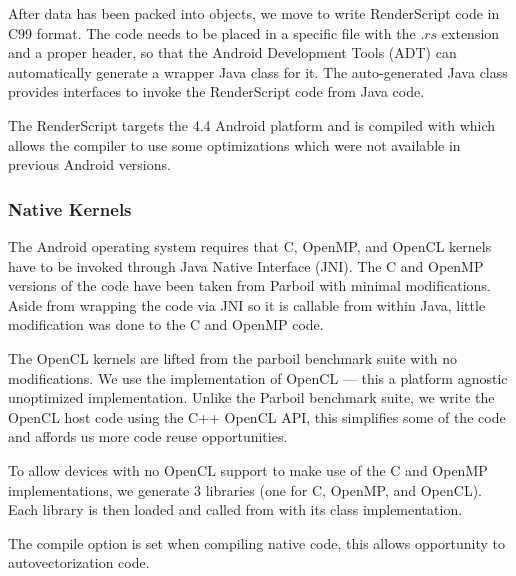 After data has been packed into  objects, we move to write
RenderScript code in C99 format. The code needs to be placed in a specific file
with the $.rs$ extension and a proper header, so that the Android Development
Tools (ADT) can automatically generate a wrapper Java class for it. The
auto-generated Java class provides interfaces to invoke the RenderScript code
from Java code.

The RenderScript targets the $4.4$ Android platform and 
	is compiled with  which
	allows the compiler to use some optimizations which were not available in
	previous Android versions.

\subsubsection{Native Kernels}

The Android operating system requires that C, OpenMP, and OpenCL kernels have to
be invoked through Java Native Interface (JNI).  The C and OpenMP versions of
the code have been taken from Parboil with minimal modifications.  Aside from
wrapping the code via JNI so it is callable from within Java, little
modification was done to the C and OpenMP code.

The OpenCL kernels are lifted from the parboil benchmark suite with no
modifications.  We use the  implementation of OpenCL --- this a
platform agnostic unoptimized implementation.  Unlike the Parboil benchmark
suite, we write the OpenCL host code using the C++ OpenCL API, this simplifies
some of the code and affords us more code reuse opportunities.

To allow devices with no OpenCL support to make use of the C and OpenMP
implementations, we generate 3 libraries (one for C, OpenMP, and OpenCL).  Each
library is then loaded and called from with its class implementation.

The 
 compile option  is set when compiling native code, this allows opportunity to autovectorization code.
